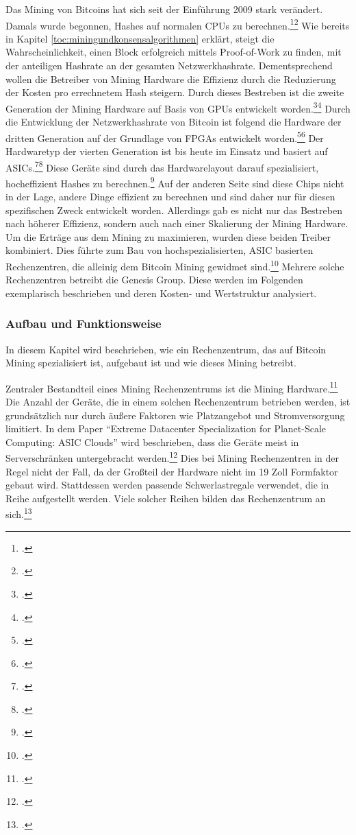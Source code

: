 Das Mining von Bitcoins hat sich seit der Einführung 2009 stark verändert. Damals wurde begonnen, Hashes auf
normalen \acp{CPU} zu berechnen.\footcite[Vgl.][S. 97f]{xie2018extreme}\footcite[Vgl.][S. 62]{taylor2017evolution}
Wie bereits in Kapitel \ref{toc:miningundkonsensalgorithmen} erklärt, steigt die Wahrscheinlichkeit, einen Block
erfolgreich mittels Proof-of-Work zu finden, mit der anteiligen Hashrate an der gesamten Netzwerkhashrate.
Dementsprechend wollen die Betreiber von Mining Hardware die Effizienz durch die Reduzierung der Kosten pro
errechnetem Hash steigern. Durch dieses Bestreben ist die zweite Generation der Mining Hardware auf Basis von
\acp{GPU} entwickelt worden.\footcite[Vgl.][S. 98]{xie2018extreme}\footcite[Vgl.][S. 62]{taylor2017evolution}
Durch die Entwicklung der Netzwerkhashrate von Bitcoin ist folgend die Hardware der dritten Generation auf der
Grundlage von \acp{FPGA} entwickelt worden.\footcite[Vgl.][S. 98]{xie2018extreme}\footcite[Vgl.][S. 62f]{taylor2017evolution}
Der Hardwaretyp der vierten Generation ist bis heute im Einsatz und basiert auf
\acp{ASIC}.\footcite[Vgl.][S. 98f]{xie2018extreme}\footcite[Vgl.][S. 15]{gai2020blockchain} Diese Geräte sind
durch das Hardwarelayout darauf spezialisiert, hocheffizient Hashes zu berechnen.\footcite[Vgl.][S. 15]{gai2020blockchain}
Auf der anderen Seite sind diese Chips nicht in der Lage, andere Dinge effizient zu berechnen und sind daher nur für diesen
spezifischen Zweck entwickelt worden. Allerdings gab es nicht nur das Bestreben nach höherer Effizienz, sondern auch
nach einer Skalierung der Mining Hardware. Um die Erträge aus dem Mining zu maximieren, wurden diese beiden Treiber
kombiniert. Dies führte zum Bau von hochspezialisierten, ASIC basierten Rechenzentren, die alleinig dem Bitcoin Mining
gewidmet sind.\footcite[Vgl.][S. 97]{xie2018extreme} Mehrere solche Rechenzentren betreibt die Genesis Group. Diese werden
im Folgenden exemplarisch beschrieben und deren Kosten- und Wertstruktur analysiert.

\subsubsection{Aufbau und Funktionsweise} \label{toc:aufbauundfunktionsweise}

In diesem Kapitel wird beschrieben, wie ein Rechenzentrum, das auf Bitcoin Mining spezialisiert ist, aufgebaut ist
und wie dieses Mining betreibt.

Zentraler Bestandteil eines Mining Rechenzentrums ist die Mining Hardware.\footcite[Vgl.][S. 327]{derks2018chaining}
Die Anzahl der Geräte, die in einem solchen Rechenzentrum betrieben werden, ist grundsätzlich nur durch äußere Faktoren
wie Platzangebot und Stromversorgung limitiert. In dem Paper "`Extreme Datacenter Specialization for Planet-Scale
Computing: ASIC Clouds"' wird beschrieben, dass die Geräte meist in Serverschränken untergebracht
werden.\footcite[Vgl.][Abb. 5]{xie2018extreme} Dies bei Mining Rechenzentren in der Regel nicht der Fall,
da der Großteil der Hardware nicht im 19 Zoll Formfaktor gebaut wird. Stattdessen werden passende Schwerlastregale
verwendet, die in Reihe aufgestellt werden. Viele solcher Reihen bilden das Rechenzentrum an
sich.\footcite[Vgl.][]{appendix:layoutkardok}

